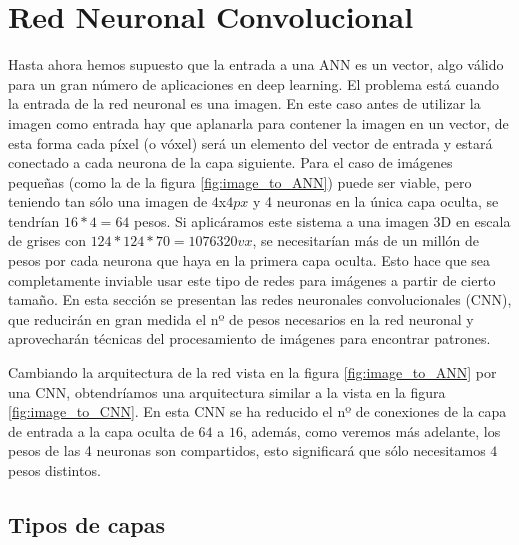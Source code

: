 \chapter{Red Neuronal Convolucional}\label{cnn}

Hasta ahora hemos supuesto que la entrada a una ANN es un vector, algo válido para un gran número de aplicaciones en deep learning. El problema está cuando la entrada de la red neuronal es una imagen. En este caso antes de utilizar la imagen como entrada hay que aplanarla para contener la imagen en un vector, de esta forma cada píxel (o vóxel) será un elemento del vector de entrada y estará conectado a cada neurona de la capa siguiente. Para el caso de imágenes pequeñas (como la de la figura \ref{fig:image_to_ANN}) puede ser viable, pero teniendo tan sólo una imagen de $4$x$4px$ y 4 neuronas en la única capa oculta, se tendrían $16*4=64$ pesos. Si aplicáramos este sistema a una imagen 3D en escala de grises con $124*124*70=1076320vx$, se necesitarían más de un millón de pesos por cada neurona que haya en la primera capa oculta. Esto hace que sea completamente inviable usar este tipo de redes para imágenes a partir de cierto tamaño. En esta sección se presentan las redes neuronales convolucionales (CNN), que reducirán en gran medida el nº de pesos necesarios en la red neuronal y aprovecharán técnicas del procesamiento de imágenes para encontrar patrones.


Cambiando la arquitectura de la red vista en la figura \ref{fig:image_to_ANN} por una CNN, obtendríamos una arquitectura similar a la vista en la figura \ref{fig:image_to_CNN}. En esta CNN se ha reducido el nº de conexiones de la capa de entrada a la capa oculta de $64$ a $16$, además, como veremos más adelante, los pesos de las 4 neuronas son compartidos, esto significará que sólo necesitamos $4$ pesos distintos.


\section{Tipos de capas}

